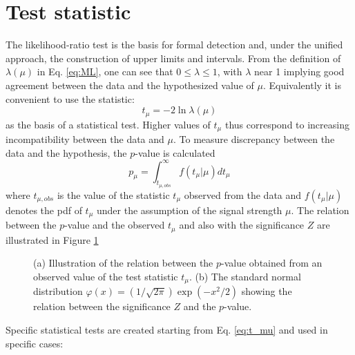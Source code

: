 \documentclass[a4paper, oneside, 11pt, openright]{book}
\begin{document}
 		\section{Test statistic}
 			The likelihood-ratio test \cite{Statistic} is the basis for formal detection and, under the unified approach, the construction of upper limits and intervals. %
 			From the definition of $\lambda(\mu)$ in Eq. \ref{eq:ML}, one can see that $0 \leq \lambda \leq 1$, with $\lambda$ near 1 implying good agreement between the data and the hypothesized value of $\mu$. Equivalently it is convenient to use the statistic:
 			\begin{equation}\label{eq:t_mu}
 				t_{\mu} = -2\ln\lambda(\mu)
 			\end{equation}
 			as the basis of a statistical test. Higher values of $t_{\mu}$ thus correspond to increasing incompatibility between the data and $\mu$. To measure discrepancy between the data and the hypothesis, the $p$-value is calculated
 			\begin{equation}\label{eq:p_mu}
 				p_{\mu} = \int_{t_{\mu,obs}}^{\infty} f(t_{\mu}|\mu) dt_{\mu}
 			\end{equation}
 			where $t_{\mu,obs}$ is the value of the statistic $t_{\mu}$ observed from the data and $f(t_{\mu}|\mu)$ denotes the pdf of $t_{\mu}$ under the assumption of the signal strength $\mu$. The relation between the $p$-value and the observed $t_{\mu}$ and also with the significance $Z$ are illustrated in Figure \ref{fig:p_mu_Z}
 			\begin{figure}
 				\centering
 				\caption{(a) Illustration of the relation between the $p$-value obtained from an observed value of the test statistic $t_{\mu}$. (b) The standard normal distribution $\varphi(x)=(1/\sqrt{2\pi})\exp(-x^2/2)$ showing the relation between the significance $Z$ and the $p$-value.}
 				\label{fig:p_mu_Z}
 			\end{figure}
 			Specific statistical tests are created starting from Eq. \ref{eq:t_mu} and used in specific cases:
\end{document}
